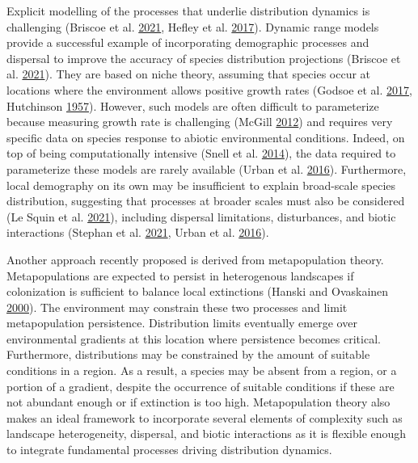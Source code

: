 \documentclass[12pt]{article}
\begin{document}
Explicit modelling of the processes that underlie distribution dynamics
is challenging (Briscoe et al.
\protect\hyperlink{ref-briscoe_can_2021}{2021}, Hefley et al.
\protect\hyperlink{ref-hefley_when_2017}{2017}). Dynamic range models
provide a successful example of incorporating demographic processes and
dispersal to improve the accuracy of species distribution projections
(Briscoe et al. \protect\hyperlink{ref-briscoe_can_2021}{2021}). They
are based on niche theory, assuming that species occur at locations
where the environment allows positive growth rates (Godsoe et al.
\protect\hyperlink{ref-godsoe_integrating_2017}{2017}, Hutchinson
\protect\hyperlink{ref-hutchinson_concluding_1957}{1957}). However, such
models are often difficult to parameterize because measuring growth rate
is challenging (McGill \protect\hyperlink{ref-mcgill_trees_2012}{2012})
and requires very specific data on species response to abiotic
environmental conditions. Indeed, on top of being computationally
intensive (Snell et al. \protect\hyperlink{ref-snell_using_2014}{2014}),
the data required to parameterize these models are rarely available
(Urban et al. \protect\hyperlink{ref-urban_improving_2016}{2016}).
Furthermore, local demography on its own may be insufficient to explain
broad-scale species distribution, suggesting that processes at broader
scales must also be considered (Le Squin et al.
\protect\hyperlink{ref-le_squin_climateinduced_2021}{2021}), including
dispersal limitations, disturbances, and biotic interactions (Stephan et
al. \protect\hyperlink{ref-stephan_positive_2021}{2021}, Urban et al.
\protect\hyperlink{ref-urban_improving_2016}{2016}).

Another approach recently proposed is derived from metapopulation
theory. Metapopulations are expected to persist in heterogenous
landscapes if colonization is sufficient to balance local extinctions
(Hanski and Ovaskainen
\protect\hyperlink{ref-hanski_metapopulation_2000}{2000}). The
environment may constrain these two processes and limit metapopulation
persistence. Distribution limits eventually emerge over environmental
gradients at this location where persistence becomes critical.
Furthermore, distributions may be constrained by the amount of suitable
conditions in a region. As a result, a species may be absent from a
region, or a portion of a gradient, despite the occurrence of suitable
conditions if these are not abundant enough or if extinction is too
high. Metapopulation theory also makes an ideal framework to incorporate
several elements of complexity such as landscape heterogeneity,
dispersal, and biotic interactions as it is flexible enough to integrate
fundamental processes driving distribution dynamics.
\end{document}
